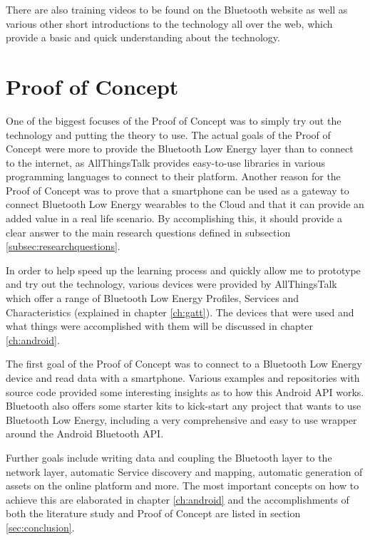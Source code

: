 \documentclass[pdftex,a4paper,12pt,twoside]{report}
\begin{document}
There are also training videos to be found on the Bluetooth website as well as various other short introductions to the technology all over the web, which provide a basic and quick understanding about the technology.

\section{Proof of Concept}
\label{sec:poc}
One of the biggest focuses of the Proof of Concept was to simply try out the technology and putting the theory to use. The actual goals of the Proof of Concept were more to provide the Bluetooth Low Energy layer than to connect to the internet, as AllThingsTalk provides easy-to-use libraries in various programming languages to connect to their platform. Another reason for the Proof of Concept was to prove that a smartphone can be used as a gateway to connect Bluetooth Low Energy wearables to the Cloud and that it can provide an added value in a real life scenario. By accomplishing this, it should provide a clear answer to the main research questions defined in subsection \ref{subsec:researchquestions}.

In order to help speed up the learning process and quickly allow me to prototype and try out the technology, various devices were provided by AllThingsTalk which offer a range of Bluetooth Low Energy Profiles, Services and Characteristics (explained in chapter \ref{ch:gatt}). The devices that were used and what things were accomplished with them will be discussed in chapter \ref{ch:android}.

The first goal of the Proof of Concept was to connect to a Bluetooth Low Energy device and read data with a smartphone. Various examples and repositories with source code provided some interesting insights as to how this Android API works. Bluetooth also offers some starter kits to kick-start any project that wants to use Bluetooth Low Energy, including a very comprehensive and easy to use wrapper around the Android Bluetooth API.

Further goals include writing data and coupling the Bluetooth layer to the network layer, automatic Service discovery and mapping, automatic generation of assets on the online platform and more. The most important concepts on how to achieve this are elaborated in chapter \ref{ch:android} and the accomplishments of both the literature study and Proof of Concept are listed in section \ref{sec:conclusion}.


\end{document}
